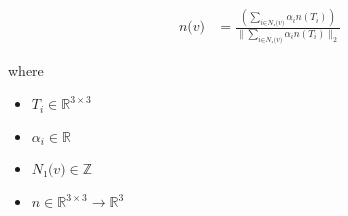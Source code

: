 \documentclass[12pt]{article}
\begin{document}
\begin{align*}
\textit{n(v)} & = \frac{\left( \sum_{\textit{i} \in \textit{N₁(v)} } \textit{α}_{ \textit{i} }\textit{n}\left( \textit{T}_{ \textit{i} } \right) \right)}{\|\sum_{\textit{i} \in \textit{N₁(v)} } \textit{α}_{ \textit{i} }\textit{n}\left( \textit{T}_{ \textit{i} } \right)\|_2}
\end{align*}

where
\begin{itemize}
\item $\textit{T}_{\textit{i}} \in \mathbb{R}^{ 3 \times 3 }$
\item $\textit{α}_{\textit{i}} \in \mathbb{{R}}$
\item $\textit{N₁(v)} \in \mathbb{Z}$
\item $\textit{n} \in \mathbb{R}^{ 3 \times 3 }\rightarrow \mathbb{R}^{ 3}$
\end{itemize}
\end{document}
